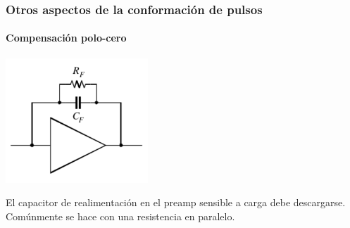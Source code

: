 \documentclass{beamer}
\begin{document}
\begin{frame}
\frametitle{Otros aspectos de la conformación de pulsos}
\framesubtitle{Compensación polo-cero}
\begin{center}
\includegraphics[width=0.4\textwidth]{d2/pz_csp}
\end{center}
El capacitor de realimentación en el preamp sensible a carga debe descargarse. 
Comúnmente se hace con una resistencia en paralelo.
\end{frame} 
\end{document}

